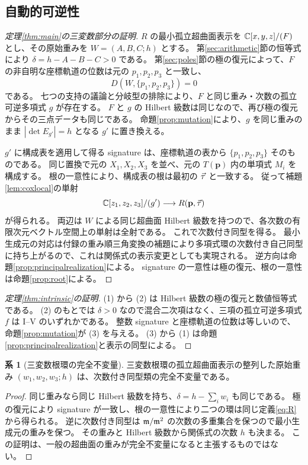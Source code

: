 \documentclass[11pt,a4paper]{ltjsarticle}
\numberwithin{equation}{section}
\theoremstyle{definition}
\newtheorem{corollary}[theorem]{系}
\newcommand{\bp}{\mathbf p}\newcommand{\bw}{\mathbf w}\newcommand{\one}{\mathbf 1}
\begin{document}
\subsection{自動的可逆性}
\begin{proof}[定理\ref{thm:main}の三変数部分の証明]
$R$ の最小孤立超曲面表示を $\mathbb C[x,y,z]/(F)$ とし、その原始重みを $W=(A,B,C;h)$ とする。
第\ref{sec:arithmetic}節の恒等式により $\delta=h-A-B-C>0$ である。
第\ref{sec:poles}節の極の復元によって、$F$ の非自明な座標軌道の位数は元の $p_1,p_2,p_3$ と一致し、
\[
 D(W,\{p_1,p_2,p_3\})=0
\]
である。
七つの支持の議論と分岐型の排除により、$F$ と同じ重み・次数の孤立可逆多項式 $g$ が存在する。
$F$ と $g$ の Hilbert 級数は同じなので、再び極の復元からその三点データも同じである。
命題\ref{prop:mutation}により、$g$ を同じ重みのまま $|\det E_{g'}|=h$ となる $g'$ に置き換える。

$g'$ に構成表を適用して得る signature は、座標軌道の表から $\{p_1,p_2,p_3\}$ そのものである。
同じ置換で元の $X_1,X_2,X_3$ を並べ、元の $T(\bp)$ 内の単項式 $M_i$ を構成する。
根の一意性により、構成表の根は最初の $\vec\tau$ と一致する。
従って補題\ref{lem:coxlocal}の単射
\[
 \C[z_1,z_2,z_3]/(g')\longrightarrow R(\bp,\ta)
\]
が得られる。
両辺は $W$ による同じ超曲面 Hilbert 級数を持つので、各次数の有限次元ベクトル空間上の単射は全射である。
これで次数付き同型を得る。
最小生成元の対応は付録の重み順三角変換の補題により多項式環の次数付き自己同型に持ち上がるので、これは関係式の表示変更としても実現される。
逆方向は命題\ref{prop:principalrealization}による。
signature の一意性は極の復元、根の一意性は命題\ref{prop:root}による。
\end{proof}

\begin{proof}[定理\ref{thm:intrinsic}の証明]
(1) から (2) は Hilbert 級数の極の復元と数値恒等式である。
(2) のもとでは $\delta>0$ なので混合二次項はなく、三項の孤立可逆多項式 $f$ は I--V のいずれかである。
整数 signature と座標軌道の位数は等しいので、命題\ref{prop:mutation}が (3) を与える。
(3) から (1) は命題\ref{prop:principalrealization}と表示の同型による。
\end{proof}

\begin{corollary}[三変数根環の完全不変量]\label{cor:weightkey}
三変数根環の孤立超曲面表示の整列した原始重み $(w_1,w_2,w_3;h)$ は、次数付き同型類の完全不変量である。
\end{corollary}
\begin{proof}
同じ重みなら同じ Hilbert 級数を持ち、$\delta=h-\sum_iw_i$ も同じである。
極の復元により signature が一致し、根の一意性により二つの環は同じ定義\eqref{eq:R}から得られる。
逆に次数付き同型は $\mathfrak m/\mathfrak m^2$ の次数の多重集合を保つので最小生成元の重みを保つ。
その重みと Hilbert 級数から関係式の次数 $h$ も決まる。
この証明は、一般の超曲面の重みが完全不変量になると主張するものではない。
\end{proof}
\end{document}

